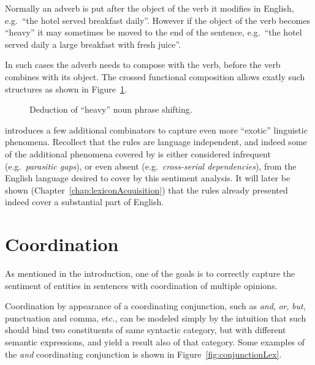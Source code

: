 \begin{example}
Normally an adverb is put after the object of the verb it modifies in English, e.g.\ ``the hotel served breakfast daily''. However if the object of the verb becomes ``heavy'' it may sometimes be moved to the end of the sentence, e.g.\ ``the hotel served daily a large breakfast with fresh juice''.

In such cases the adverb needs to compose with the verb, before the verb combines with its object. The crossed functional composition allows exatly such structures as shown in Figure~\ref{fig:heavyNP}.

\begin{figure}[ht]
\vspace{2em}
\center
{}
\caption{Deduction of ``heavy'' noun phrase shifting.}
\label{fig:heavyNP}
\vspace{1em}
\end{figure}
\label{ex:heavyNP}
\end{example}
\done

\citeauthor{ts}  introduces a few additional combinators to capture even more ``exotic'' linguistic phenomena. Recollect that the rules are language independent, and indeed some of the additional phenomena covered by \citeauthor{sp} is either considered infrequent (e.g.\ \emph{parasitic gaps}), or even absent (e.g.\ \emph{cross-serial dependencies}), from the English language desired to cover by this sentiment analysis. It will later be shown (Chapter~\ref{chap:lexiconAcquisition}) that the rules already presented indeed cover a substantial part of English.

\section{Coordination}
As mentioned in the introduction, one of the goals is to correctly capture the sentiment of entities in sentences with coordination of multiple opinions.

Coordination by appearance of a coordinating conjunction, such as \emph{and}, \emph{or}, \emph{but}, punctuation and comma, etc., can be modeled simply by the intuition that such should bind two constituents of same syntactic category, but with different semantic expressions, and yield a result also of that category. Some examples of the \emph{and} coordinating conjunction is shown in Figure~\ref{fig:conjunctionLex}.

